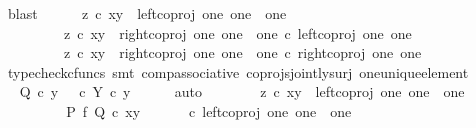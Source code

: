 \begin{isabellebody}
\ blast\isanewline
\isanewline
\ \ \ \ \isamarkupfalse%
\ {\isachardoublequoteopen}{\isacharparenleft}{\kern0pt}z\ {\isasymcirc}\isactrlsub c\ {\isasymlangle}x{\isacharcomma}{\kern0pt}y{\isasymrangle}\ {\isacharequal}{\kern0pt}\ left{\isacharunderscore}{\kern0pt}coproj\ one\ {\isacharparenleft}{\kern0pt}one\ {\isasymCoprod}\ one{\isacharparenright}{\kern0pt}{\isacharparenright}{\kern0pt}\isanewline
\ \ \ \ \ \ \ \ {\isasymor}\ {\isacharparenleft}{\kern0pt}z\ {\isasymcirc}\isactrlsub c\ {\isasymlangle}x{\isacharcomma}{\kern0pt}y{\isasymrangle}\ {\isacharequal}{\kern0pt}\ right{\isacharunderscore}{\kern0pt}coproj\ one\ {\isacharparenleft}{\kern0pt}one\ {\isasymCoprod}\ one{\isacharparenright}{\kern0pt}\ {\isasymcirc}\isactrlsub c\ left{\isacharunderscore}{\kern0pt}coproj\ one\ one{\isacharparenright}{\kern0pt}\isanewline
\ \ \ \ \ \ \ \ {\isasymor}\ {\isacharparenleft}{\kern0pt}z\ {\isasymcirc}\isactrlsub c\ {\isasymlangle}x{\isacharcomma}{\kern0pt}y{\isasymrangle}\ {\isacharequal}{\kern0pt}\ right{\isacharunderscore}{\kern0pt}coproj\ one\ {\isacharparenleft}{\kern0pt}one\ {\isasymCoprod}\ one{\isacharparenright}{\kern0pt}\ {\isasymcirc}\isactrlsub c\ right{\isacharunderscore}{\kern0pt}coproj\ one\ one{\isacharparenright}{\kern0pt}{\isachardoublequoteclose}\isanewline
\ \ \ \ \ \ \isamarkupfalse%
\ {\isacharparenleft}{\kern0pt}typecheck{\isacharunderscore}{\kern0pt}cfuncs{\isacharcomma}{\kern0pt}\ smt\ comp{\isacharunderscore}{\kern0pt}associative{}\ coprojs{\isacharunderscore}{\kern0pt}jointly{\isacharunderscore}{\kern0pt}surj\ one{\isacharunderscore}{\kern0pt}unique{\isacharunderscore}{\kern0pt}element{\isacharparenright}{\kern0pt}\isanewline
\ \ \ \ \isamarkupfalse%
\ \isamarkupfalse%
\ {\isachardoublequoteopen}Q\ {\isasymcirc}\isactrlsub c\ y\ {\isacharequal}{\kern0pt}\ {\isacharparenleft}{\kern0pt}{\isasymt}\ {\isasymcirc}\isactrlsub c\ {\isasymbeta}\isactrlbsub Y\isactrlesub {\isacharparenright}{\kern0pt}\ {\isasymcirc}\isactrlsub c\ y{\isachardoublequoteclose}\isanewline
\ \ \ \ \isamarkupfalse%
\ auto\isanewline
\ \ \ \ \ \ \isamarkupfalse%
\ {\isachardoublequoteopen}z\ {\isasymcirc}\isactrlsub c\ {\isasymlangle}x{\isacharcomma}{\kern0pt}y{\isasymrangle}\ {\isacharequal}{\kern0pt}\ left{\isacharunderscore}{\kern0pt}coproj\ one\ {\isacharparenleft}{\kern0pt}one\ {\isasymCoprod}\ one{\isacharparenright}{\kern0pt}{\isachardoublequoteclose}\isanewline
\ \ \ \ \ \ \isamarkupfalse%
\ \isamarkupfalse%
\ {\isachardoublequoteopen}{\isacharparenleft}{\kern0pt}P\ {\isasymtimes}\isactrlsub f\ Q{\isacharparenright}{\kern0pt}\ {\isasymcirc}\isactrlsub c\ {\isasymlangle}x{\isacharcomma}{\kern0pt}y{\isasymrangle}\ {\isacharequal}{\kern0pt}\ {\isacharparenleft}{\kern0pt}{\isasymlangle}{\isasymt}{\isacharcomma}{\kern0pt}{\isasymt}{\isasymrangle}\ {\isasymamalg}\ {\isasymlangle}{\isasymf}{\isacharcomma}{\kern0pt}{\isasymf}{\isasymrangle}\ {\isasymamalg}\ {\isasymlangle}{\isasymf}{\isacharcomma}{\kern0pt}{\isasymt}{\isasymrangle}{\isacharparenright}{\kern0pt}\ {\isasymcirc}\isactrlsub c\ left{\isacharunderscore}{\kern0pt}coproj\ one\ {\isacharparenleft}{\kern0pt}one\ {\isasymCoprod}\ one{\isacharparenright}{\kern0pt}{\isachardoublequoteclose}\isanewline

\end{isabellebody}
